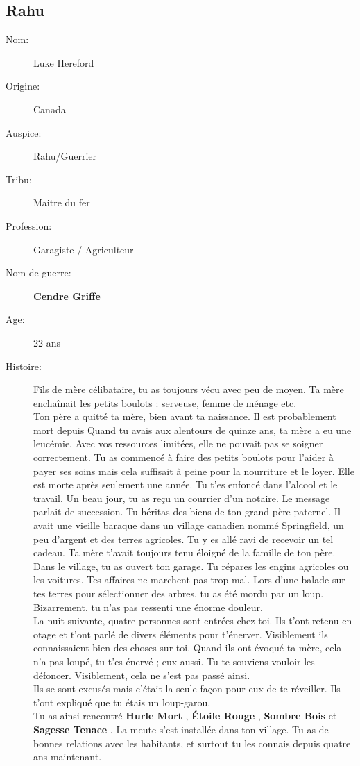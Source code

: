 \documentclass[oneside,12pt]{book}
\newcommand{\Lynn}{\textbf{Étoile Rouge} }
\newcommand{\Jessica}{\textbf{Sagesse Tenace} }
\newcommand{\Luke}{\textbf{Cendre Griffe} }
\newcommand{\Peter}{\textbf{Hurle Mort} }
\newcommand{\Leonard}{\textbf{Sombre Bois} }
\begin{document}
\begin{flushleft}
\section{Rahu}
\begin{description}
\item[Nom:]{Luke Hereford}
\item[Origine:]{Canada}
\item[Auspice:]{Rahu/Guerrier}
\item[Tribu:]{Maitre du fer}
\item[Profession:]{Garagiste / Agriculteur}
\item[Nom de guerre:]{\Luke}
\item[Age:]{22 ans}
\item[Histoire:]{
Fils de mère célibataire, tu as toujours vécu avec peu de moyen. Ta mère enchaînait les petits boulots : serveuse, femme de ménage etc.\\
Ton père a quitté ta mère, bien avant ta naissance. Il est probablement mort depuis
Quand tu avais aux alentours de quinze ans, ta mère a eu une leucémie. Avec vos ressources limitées, elle ne pouvait pas se soigner correctement. Tu as commencé à faire des petits boulots pour l’aider à payer ses soins mais cela suffisait à peine pour la nourriture et le loyer. Elle est morte après seulement une année. Tu t’es enfoncé dans l’alcool et le travail. Un beau jour, tu as reçu un courrier d’un notaire. Le message parlait de succession. Tu héritas des biens de ton grand-père paternel. Il avait une vieille baraque dans un village canadien nommé Springfield, un peu d’argent et des terres agricoles. Tu y es allé ravi de recevoir un tel cadeau. Ta mère t’avait toujours tenu éloigné de la famille de ton père.\\
Dans le village, tu as ouvert ton garage. Tu répares les engins agricoles ou les voitures. Tes affaires ne marchent pas trop mal. Lors d’une balade sur tes terres pour sélectionner des arbres, tu as été mordu par un loup. Bizarrement, tu n’as pas ressenti une énorme douleur.\\
La nuit suivante, quatre personnes sont entrées chez toi. Ils t’ont retenu en otage et t’ont parlé de divers éléments pour t’énerver. Visiblement ils connaissaient bien des choses sur toi. Quand ils ont évoqué ta mère, cela n’a pas loupé, tu t’es énervé ; eux aussi. Tu te souviens vouloir les défoncer. Visiblement, cela ne s’est pas passé ainsi.\\
Ils se sont excusés mais c’était la seule façon pour eux de te réveiller. Ils t’ont expliqué que tu étais un loup-garou.\\
Tu as ainsi rencontré \Peter , \Lynn , \Leonard et \Jessica . 
La meute s'est installée dans ton village.
Tu as de bonnes relations avec les habitants, et surtout tu les connais depuis quatre ans maintenant.\\

}
\end{description}
\end{flushleft}
\end{document}
